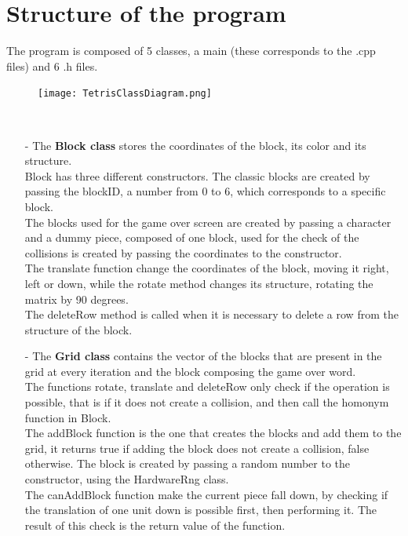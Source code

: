 \documentclass[18pt,oneside,a4paper, titlepage]{article}
\begin{document}
\section{Structure of the program}
	The program is composed of 5 classes, a main (these corresponds to the .cpp files) and 6 .h files.\\
	\vspace{0.5cm}
	\begin{figure}[h]
		\centering
		\texttt{[image: TetrisClassDiagram.png]}
	\end{figure}
	\vspace{0.5cm}
	\\
	\begin{itemize}
		\item[-] The \textbf{Block class} stores the coordinates of the block, its color and its structure.\\
		Block has three different constructors. The classic blocks are created by passing the blockID, a number from 0 to 6, which corresponds to a specific block.\\
		The blocks used for the game over screen are created by passing a character and a dummy piece, composed of one block, used for the check of the collisions is created by passing the coordinates to the constructor.\\
		The translate function change the coordinates of the block, moving it right, left or down, while the rotate method changes its structure, rotating the matrix by 90 degrees.\\
		The deleteRow method is called when it is necessary to delete a row from the structure of the block.\\
		\item[-] The \textbf{Grid class} contains the vector of the blocks that are present in the grid at every iteration and the block composing the game over word.\\
		The functions rotate, translate and deleteRow only check if the operation is possible, that is if it does not create a collision, and then call the homonym function in Block.\\
		The addBlock function is the one that creates the blocks and add them to the grid, it returns true if adding the block does not create a collision, false otherwise. The block is created by passing a random number to the constructor, using the HardwareRng class.\\
		The canAddBlock function make the current piece fall down, by checking if the translation of one unit down is possible first, then performing it. The result of this check is the return value of the function.\\

\end{itemize}
\end{document}
